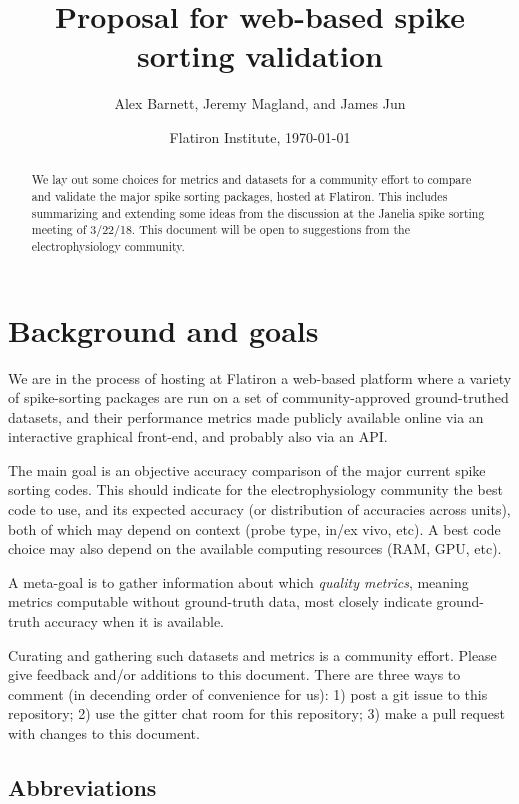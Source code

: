 \documentclass[10pt]{article}
\newcommand{\com}[1]{{\marginpar{\sffamily{\scriptsize #1}}}}
\begin{document}
\title{Proposal for web-based spike sorting validation}
\author{Alex Barnett, Jeremy Magland, and James Jun}
\date{Flatiron Institute, \today}
\maketitle
\begin{abstract}
  We lay out some choices for metrics and datasets for a community effort to
  compare and validate the major spike sorting packages, hosted at Flatiron.
  This includes summarizing and extending some ideas from the discussion at the
  Janelia spike sorting meeting of 3/22/18.
  This document will be open to suggestions from the electrophysiology community.
\end{abstract}

\section{Background and goals}

We are in the process of hosting at Flatiron a web-based platform where
a variety of spike-sorting packages are run on
a set of community-approved ground-truthed datasets, and their
performance metrics made publicly available online via an interactive
graphical front-end, and probably also via an API.

The main goal is an objective accuracy comparison of the major current
spike sorting codes. This should indicate for the electrophysiology community
the best code to use, and its expected accuracy (or distribution of
accuracies across units),
both of which may depend on context
(probe type, in/ex vivo, etc). A best code choice may also depend on
the available computing resources (RAM, GPU, etc).

A meta-goal is to gather information about which {\em quality metrics}, meaning
metrics computable without ground-truth data, most closely indicate ground-truth
accuracy when it is available.

Curating and gathering such datasets and metrics is a community effort.
Please give feedback and/or additions to this document.
There are three ways to comment (in decending order of convenience for us):
1) post a git issue to
this repository; 2) use the gitter chat room for this repository;
3) make a pull request with changes to this document.
\com{possibly via margin comments like this}


\subsection{Abbreviations}
\end{document}
